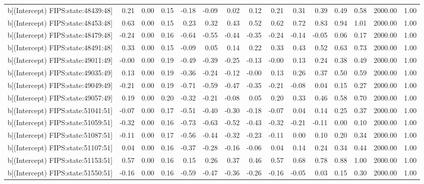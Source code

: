 \begin{table}[ht]
\begin{tabular}{rrrrrrrrrrrrrrr}
  b[(Intercept) FIPS:state:48439:48] & 0.21 & 0.00 & 0.15 & -0.18 & -0.09 & 0.02 & 0.12 & 0.21 & 0.31 & 0.39 & 0.49 & 0.58 & 2000.00 & 1.00 \\ 
  b[(Intercept) FIPS:state:48453:48] & 0.63 & 0.00 & 0.15 & 0.23 & 0.32 & 0.43 & 0.52 & 0.62 & 0.72 & 0.83 & 0.94 & 1.01 & 2000.00 & 1.00 \\ 
  b[(Intercept) FIPS:state:48479:48] & -0.24 & 0.00 & 0.16 & -0.64 & -0.55 & -0.44 & -0.35 & -0.24 & -0.14 & -0.05 & 0.06 & 0.17 & 2000.00 & 1.00 \\ 
  b[(Intercept) FIPS:state:48491:48] & 0.33 & 0.00 & 0.15 & -0.09 & 0.05 & 0.14 & 0.22 & 0.33 & 0.43 & 0.52 & 0.63 & 0.73 & 2000.00 & 1.00 \\ 
  b[(Intercept) FIPS:state:49011:49] & -0.00 & 0.00 & 0.19 & -0.49 & -0.39 & -0.25 & -0.13 & -0.00 & 0.13 & 0.24 & 0.38 & 0.49 & 2000.00 & 1.00 \\ 
  b[(Intercept) FIPS:state:49035:49] & 0.13 & 0.00 & 0.19 & -0.36 & -0.24 & -0.12 & -0.00 & 0.13 & 0.26 & 0.37 & 0.50 & 0.59 & 2000.00 & 1.00 \\ 
  b[(Intercept) FIPS:state:49049:49] & -0.21 & 0.00 & 0.19 & -0.71 & -0.59 & -0.47 & -0.35 & -0.21 & -0.08 & 0.04 & 0.15 & 0.27 & 2000.00 & 1.00 \\ 
  b[(Intercept) FIPS:state:49057:49] & 0.19 & 0.00 & 0.20 & -0.32 & -0.21 & -0.08 & 0.05 & 0.20 & 0.33 & 0.46 & 0.58 & 0.70 & 2000.00 & 1.00 \\ 
  b[(Intercept) FIPS:state:51041:51] & -0.07 & 0.00 & 0.17 & -0.51 & -0.40 & -0.30 & -0.18 & -0.07 & 0.04 & 0.14 & 0.25 & 0.37 & 2000.00 & 1.00 \\ 
  b[(Intercept) FIPS:state:51059:51] & -0.32 & 0.00 & 0.16 & -0.73 & -0.63 & -0.52 & -0.43 & -0.32 & -0.21 & -0.11 & 0.00 & 0.10 & 2000.00 & 1.00 \\ 
  b[(Intercept) FIPS:state:51087:51] & -0.11 & 0.00 & 0.17 & -0.56 & -0.44 & -0.32 & -0.23 & -0.11 & 0.00 & 0.10 & 0.20 & 0.34 & 2000.00 & 1.00 \\ 
  b[(Intercept) FIPS:state:51107:51] & 0.04 & 0.00 & 0.16 & -0.37 & -0.28 & -0.16 & -0.06 & 0.04 & 0.14 & 0.24 & 0.34 & 0.44 & 2000.00 & 1.00 \\ 
  b[(Intercept) FIPS:state:51153:51] & 0.57 & 0.00 & 0.16 & 0.15 & 0.26 & 0.37 & 0.46 & 0.57 & 0.68 & 0.78 & 0.88 & 1.00 & 2000.00 & 1.00 \\ 
  b[(Intercept) FIPS:state:51550:51] & -0.16 & 0.00 & 0.16 & -0.59 & -0.47 & -0.36 & -0.26 & -0.16 & -0.05 & 0.03 & 0.15 & 0.30 & 2000.00 & 1.00 \\ 

\end{tabular}
\end{table}
